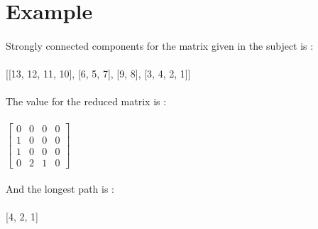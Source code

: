 \documentclass{article}
\begin{document}
\section{Example}
    \paragraph{}
        Strongly connected components for the matrix given in the subject is :
    \paragraph{}
        [[13, 12, 11, 10], [6, 5, 7], [9, 8], [3, 4, 2, 1]]
    \paragraph{}
        The value for the reduced matrix is :
    \paragraph{}
        $\begin{bmatrix}
            0&0&0&0 \\
            1&0&0&0 \\
            1&0&0&0 \\
            0&2&1&0
        \end{bmatrix}$
    \paragraph{}
        And the longest path is :
    \paragraph{}
        [4, 2, 1]
        
\end{document}
